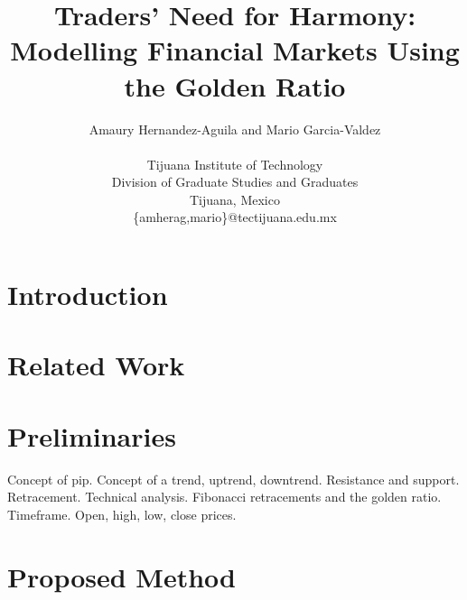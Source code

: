 \documentclass[letterpaper]{article}
\title{Traders' Need for Harmony: Modelling Financial Markets Using
  the Golden Ratio}
\author{Amaury Hernandez-Aguila and Mario Garcia-Valdez \\
\mbox{}\\
Tijuana Institute of Technology  \\
Division of Graduate Studies and Graduates \\
Tijuana, Mexico\\
\{amherag,mario\}@tectijuana.edu.mx}
\begin{document}
\maketitle

\begin{abstract}

\end{abstract}

\section{Introduction}
\label{introduction}

\citep{tirea2012stock}
\citep{chen2007fuzzy}
\citep{chakravarty2012pso}
\citep{pan2003joint}
\citep{osler2000support}
\citep{mantri2014artificial}
\citep{abdullah2012intervals}
\citep{kumar2014magic}
\citep{hellal2014wave}
\citep{zhen2010financial}
\citep{raberto2001agent}
\citep{seydel2006tools}
\citep{kotick1996introduction}
\citep{farmer2012complex}
\citep{otake2013can}
\citep{adebiyi2012stock}
\citep{chatterjee2002applications}
\citep{kotyrba2013methodology}
\citep{pan2005predicting}
\citep{kazem2013support}
\citep{livio2008golden}
\citep{murphy1999technical}
\citep{weckman2008integrated}
\citep{abounoori2014forecast}
\citep{prechter2001unconscious}
\citep{carney2005methodology}

\clearpage

\section{Related Work}
\label{related-work}

\clearpage

\section{Preliminaries}
\label{preliminaries}

Concept of pip. Concept of a trend, uptrend, downtrend. Resistance and
support. Retracement. Technical analysis. Fibonacci retracements and the
golden ratio. Timeframe. Open, high, low, close prices.

\clearpage

\section{Proposed Method}
\label{proposed-method}
\end{document}
